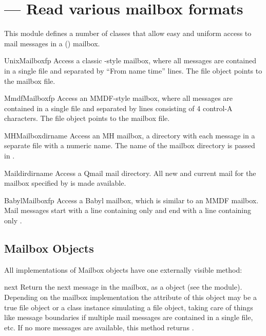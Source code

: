 \section{ ---
         Read various mailbox formats}



This module defines a number of classes that allow easy and uniform
access to mail messages in a (\UNIX{}) mailbox.

\begin{classdesc}{UnixMailbox}{fp}
Access a classic \UNIX{}-style mailbox, where all messages are contained
in a single file and separated by ``From name time'' lines.
The file object  points to the mailbox file.
\end{classdesc}

\begin{classdesc}{MmdfMailbox}{fp}
Access an MMDF-style mailbox, where all messages are contained
in a single file and separated by lines consisting of 4 control-A
characters.  The file object  points to the mailbox file.
\end{classdesc}

\begin{classdesc}{MHMailbox}{dirname}
Access an MH mailbox, a directory with each message in a separate
file with a numeric name.
The name of the mailbox directory is passed in .
\end{classdesc}

\begin{classdesc}{Maildir}{dirname}
Access a Qmail mail directory.  All new and current mail for the
mailbox specified by  is made available.
\end{classdesc}

\begin{classdesc}{BabylMailbox}{fp}
Access a Babyl mailbox, which is similar to an MMDF mailbox.  Mail
messages start with a line containing only  and
end with a line containing only .
\end{classdesc}


\subsection{Mailbox Objects \label{mailbox-objects}}

All implementations of Mailbox objects have one externally visible
method:

\begin{methoddesc}[mailbox]{next}{}
Return the next message in the mailbox, as a 
object (see the  module).  Depending on the mailbox
implementation the  attribute of this object may be a true
file object or a class instance simulating a file object, taking care
of things like message boundaries if multiple mail messages are
contained in a single file, etc.  If no more messages are available,
this method returns .
\end{methoddesc}
